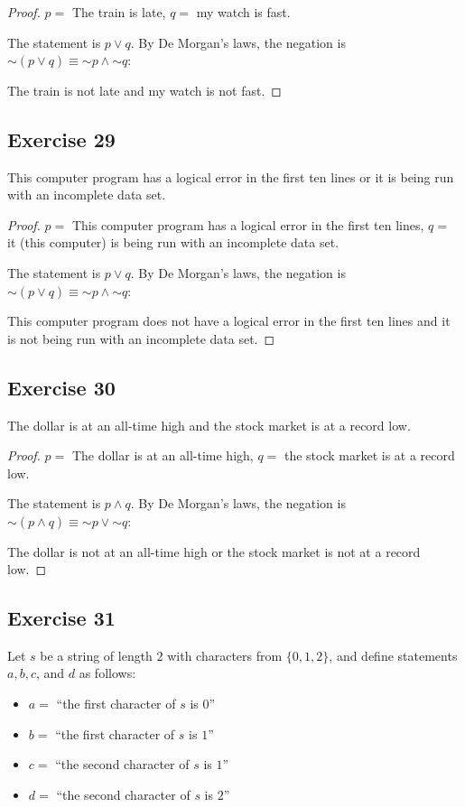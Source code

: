 \documentclass[14pt]{extarticle}
\begin{document}
\begin{proof}
$p =$ The train is late, $q =$ my watch is fast.

The statement is $p \vee q$. By De Morgan's laws, the negation is $\sim(p \vee q) \equiv {\sim p} \wedge {\sim q}$:

The train is not late and my watch is not fast.
\end{proof}

\subsection{Exercise 29}
This computer program has a logical error in the first ten lines or it is being run with an incomplete data set.

\begin{proof}
$p =$ This computer program has a logical error in the first ten lines, $q =$ it (this computer) is being run with an incomplete data set.

The statement is $p \vee q$. By De Morgan's laws, the negation is $\sim(p \vee q) \equiv {\sim p} \wedge {\sim q}$:

This computer program does not have a logical error in the first ten lines and it is not being run with an incomplete data set.
\end{proof}

\subsection{Exercise 30}
The dollar is at an all-time high and the stock market is at a record low.

\begin{proof}
$p =$ The dollar is at an all-time high, $q =$ the stock market is at a record low.

The statement is $p \wedge q$. By De Morgan's laws, the negation is $\sim(p \wedge q) \equiv {\sim p} \vee {\sim q}$:

The dollar is not at an all-time high or the stock market is not at a record low.
\end{proof}

\subsection{Exercise 31}
Let $s$ be a string of length $2$ with characters from $\{0, 1, 2\}$, and define statements $a, b, c$, and $d$ as follows:

\begin{itemize}
\item $a = $ ``the first character of $s$ is $0$''
\item $b = $ ``the first character of $s$ is $1$''
\item $c = $ ``the second character of $s$ is $1$''
\item $d = $ ``the second character of $s$ is $2$'' \end{itemize}
\end{document}
